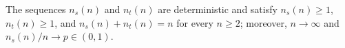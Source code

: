 The sequences \(n_s(n)\) and \(n_t(n)\) are deterministic and satisfy \(n_s(n)\ge1\), \(n_t(n)\ge1\), and \(n_s(n)+n_t(n)=n\) for every \(n\ge2\); moreover, \(n\to\infty\) and \(n_s(n)/n\to p\in(0,1)\).